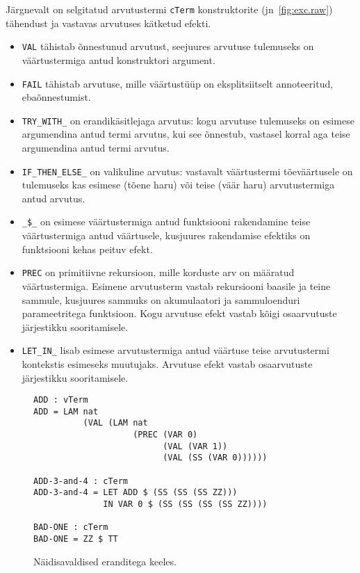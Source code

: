 \documentclass[a4paper,12pt]{article}
\begin{document}
Järgnevalt on selgitatud arvutustermi {\tt cTerm} konstruktorite (jn~\ref{fig:exc.raw}) tähendust ja vastavas arvutuses kätketud efekti.
\begin{itemize}
\item {\tt VAL} tähistab õnnestunud arvutust, seejuures arvutuse tulemuseks on väärtustermiga antud konstruktori argument.
\item {\tt FAIL} tähistab arvutuse, mille väärtustüüp on eksplitsiitselt annoteeritud, ebaõnnestumist.
\item {\tt TRY_WITH_} on erandikäsitlejaga arvutus: kogu arvutuse tulemuseks on esimese argumendina antud termi arvutus, kui see õnnestub, vastasel korral aga teise argumendina antud termi arvutus.
\item {\tt IF_THEN_ELSE_} on valikuline arvutus: vastavalt väärtustermi tõeväärtusele on tulemuseks kas esimese (tõene haru) või teise (väär haru) arvutustermiga antud arvutus.
\item {\tt _\$_} on esimese väärtustermiga antud funktsiooni rakendamine teise väärtustermiga antud väärtusele, kusjuures rakendamise efektiks on funktsiooni kehas peituv efekt.
\item {\tt PREC} on primitiivne rekursioon, mille korduste arv on määratud väärtustermiga. Esimene arvutusterm vastab rekursiooni baasile ja teine sammule, kusjuures sammuks on akumulaatori ja sammuloenduri parameetritega funktsioon. Kogu arvutuse efekt vastab kõigi osaarvutuste järjestikku sooritamisele.
\item {\tt LET_IN_} lisab esimese arvutustermiga antud väärtuse teise arvutustermi kontekstis esimeseks muutujaks. Arvutuse efekt vastab osaarvutuste järjestikku sooritamisele.
\end{itemize}

\begin{figure}
  \begin{BVerbatim}
ADD : vTerm
ADD = LAM nat
          (VAL (LAM nat
                    (PREC (VAR 0)
                          (VAL (VAR 1))
                          (VAL (SS (VAR 0))))))

ADD-3-and-4 : cTerm
ADD-3-and-4 = LET ADD $ (SS (SS (SS ZZ)))
              IN VAR 0 $ (SS (SS (SS (SS ZZ))))

BAD-ONE : cTerm
BAD-ONE = ZZ $ TT
  \end{BVerbatim}
  \caption{Näidisavaldised eranditega keeles.}
  \label{fig:exc.raw.ex1}
\end{figure}
\end{document}

